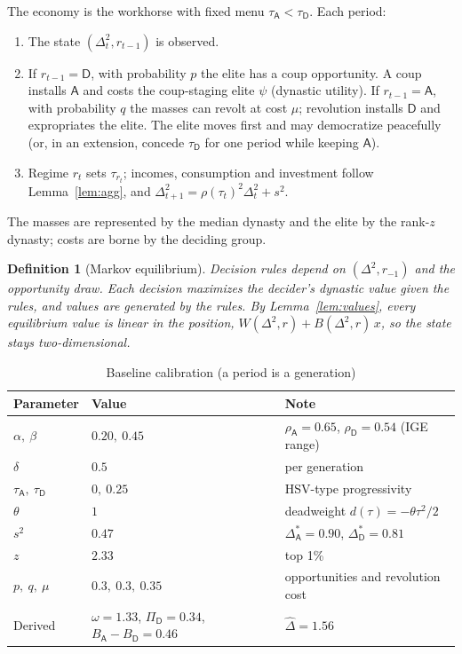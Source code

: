 \documentclass[11pt]{article}
\newtheorem{definition}{Definition}
\theoremstyle{remark}
\newcommand{\A}{\mathsf{A}}
\newcommand{\D}{\mathsf{D}}
\begin{document}
The economy is the workhorse with fixed menu $\tau_\A<\tau_\D$.  Each period:
\begin{enumerate}
\item The state $(\Delta_t^2,r_{t-1})$ is observed.
\item If $r_{t-1}=\D$, with probability $p$ the elite has a coup opportunity.  A coup installs $\A$ and costs the coup-staging elite $\psi$ (dynastic utility).  If $r_{t-1}=\A$, with probability $q$ the masses can revolt at cost $\mu$; revolution installs $\D$ and expropriates the elite.  The elite moves first and may democratize peacefully (or, in an extension, concede $\tau_\D$ for one period while keeping $\A$).
\item Regime $r_t$ sets $\tau_{r_t}$; incomes, consumption and investment follow Lemma~\ref{lem:agg}, and $\Delta_{t+1}^2=\rho(\tau_t)^2\Delta_t^2+s^2$.
\end{enumerate}
The masses are represented by the median dynasty and the elite by the rank-$z$ dynasty; costs are borne by the deciding group.

\begin{definition}[Markov equilibrium]
Decision rules depend on $(\Delta^2,r_{-1})$ and the opportunity draw.  Each decision maximizes the decider's dynastic value given the rules, and values are generated by the rules.  By Lemma~\ref{lem:values}, every equilibrium value is linear in the position, $W(\Delta^2,r)+B(\Delta^2,r)\,x$, so the state stays two-dimensional.
\end{definition}

\begin{table}[t]
\centering
\caption{Baseline calibration (a period is a generation)}\label{tab:calib}
\begin{tabular}{lll}
\toprule
Parameter & Value & Note\\
\midrule
$\alpha,\ \beta$ & $0.20,\ 0.45$ & $\rho_\A=0.65$, $\rho_\D=0.54$ (IGE range)\\
$\delta$ & $0.5$ & per generation\\
$\tau_\A,\ \tau_\D$ & $0,\ 0.25$ & HSV-type progressivity\\
$\theta$ & $1$ & deadweight $d(\tau)=-\theta\tau^2/2$\\
$s^2$ & $0.47$ & $\Delta^*_\A=0.90$, $\Delta^*_\D=0.81$\\
$z$ & $2.33$ & top 1\%\\
$p,\ q,\ \mu$ & $0.3,\ 0.3,\ 0.35$ & opportunities and revolution cost\\
Derived & $\omega=1.33$, $\Pi_\D=0.34$, $B_\A-B_\D=0.46$ & $\hat\Delta=1.56$\\
\bottomrule
\end{tabular}
\end{table}
\end{document}
